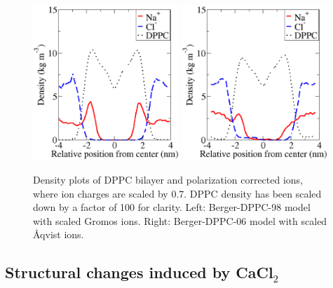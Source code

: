 \documentclass[pre,aps,floatfix,authordate1-4,twocolumn]{revtex4-1}
\begin{document}
\begin{figure}[]
  \centering
  \includegraphics[width=0.49\textwidth]{../Fig/ionscaledberger98.eps} %
  \includegraphics[width=0.49\textwidth]{../Fig/ionscaledberger06.eps} %
  \caption{\label{ionscaled}
   Density plots of DPPC bilayer and polarization corrected ions, where ion charges are scaled by 0.7. DPPC density has been scaled down by a factor of 100 for clarity. Left: Berger-DPPC-98 model with scaled Gromos ions. Right: Berger-DPPC-06 model with scaled \r{A}qvist ions.
   }
\end{figure}

\subsection{Structural changes induced by CaCl$_2$}
\end{document}
